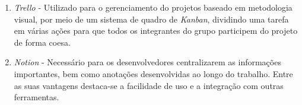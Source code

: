 \begin{enumerate}
	
	\item \textit{Trello} - Utilizado para o gerenciamento do projetos baseado em metodologia visual, por meio de um sistema de quadro de \textit{Kanban}, dividindo uma tarefa em várias ações para que todos os integrantes do grupo participem do projeto de forma coesa.
	
	\item \textit{Notion} -  Necessário para os desenvolvedores centralizarem as informações importantes, bem como anotações desenvolvidas ao longo do trabalho. Entre as suas vantagens destaca-se a facilidade de uso e a integração com outras ferramentas.
	
\end{enumerate}

